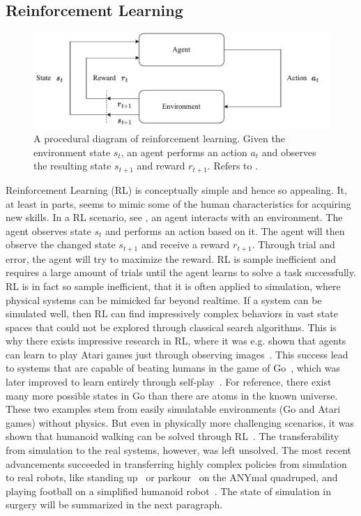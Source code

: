 \subsection{Reinforcement Learning}
\label{in:sec:reinforcement_learning}
\begin{figure}[htb]
    \centering
    \includegraphics[width=\textwidth]{introduction/fig/reinforcement_learning.pdf}
    \caption{A procedural diagram of reinforcement learning. Given the environment state $s_t$, an agent performs an action $a_t$ and observes the resulting state $s_{t+1}$ and reward $r_{t+1}$. Refers to .}
    \label{in:fig:reinforcement_learning}
\end{figure}
Reinforcement Learning (RL) is conceptually simple and hence so appealing. It, at least in parts, seems to mimic some of the human characteristics for acquiring new skills. In a RL scenario, see , an agent interacts with an environment. The agent observes state $s_t$ and performs an action based on it. The agent will then observe the changed state $s_{t+1}$ and receive a reward $r_{t+1}$. Through trial and error, the agent will try to maximize the reward. RL is sample inefficient and requires a large amount of trials until the agent learns to solve a task successfully. RL is in fact so sample inefficient, that it is often applied to simulation, where physical systems can be mimicked far beyond realtime. If a system can be simulated well, then RL can find impressively complex behaviors in vast state spaces that could not be explored through classical search algorithms. This is why there exists impressive research in RL, where it was e.g. shown that agents can learn to play Atari games just through observing images~\cite{mnih2013playing}. This success lead to systems that are capable of beating humans in the game of Go~\cite{silver2016mastering}, which was later improved to learn entirely through self-play~\cite{silver2017mastering}. For reference, there exist many more possible states in Go than there are atoms in the known universe. These two examples stem from easily simulatable environments (Go and Atari games) without physics. But even in physically more challenging scenarios, it was shown that humanoid walking can be solved through RL~\cite{schulman2017proximal}. The transferability from simulation to the real systems, however, was left unsolved. The most recent advancements succeeded in transferring highly complex policies from simulation to real robots, like standing up~\cite{rudin2022learning} or parkour~\cite{hoeller2023anymal} on the ANYmal quadruped, and playing football on a simplified humanoid robot~\cite{liu2022motor}. The state of simulation in surgery will be summarized in the next paragraph.

